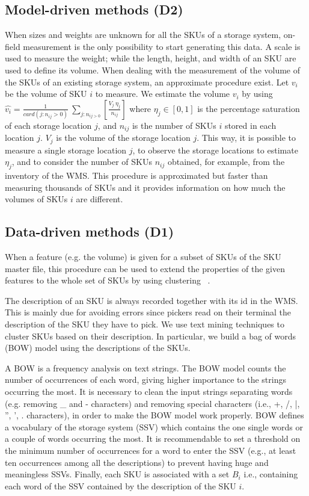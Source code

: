 \subsection{Model-driven methods (D2)}
When sizes and weights are unknown for all the SKUs of a storage system, on-field measurement is the only possibility to start generating this data. A scale is used to measure the weight; while the length, height, and width of an SKU are used to define its volume. When dealing with the measurement of the volume of the SKUs of an existing storage system, an approximate procedure exist. Let $v_i$ be the volume of SKU $i$ to measure. We estimate the volume $v_i$ by using  $\widehat{v_i}=\frac{1}{card(j:n_{ij}>0)}\ \sum_{j:n_{ij>0}}\left[\frac{V_j\ \eta_j}{n_{ij}}\right]$ where  $\eta_j\in[0,1]$ is the percentage saturation of each storage location $j$, and $n_{ij}$ is the number of SKUs $i$ stored in each location $j$. $V_j$ is the volume of the storage location $j$. This way, it is possible to measure a single storage location $j$, to observe the storage locations to estimate $\eta_j$, and to consider the number of SKUs $n_{ij}$ obtained, for example, from the inventory of the WMS. This procedure is approximated but faster than measuring thousands of SKUs and it provides information on how much the volumes of SKUs $i$ are different.

\subsection{Data-driven methods (D1)}
When a feature (e.g. the volume) is given for a subset of SKUs of the SKU master file, this procedure can be used to extend the properties of the given features to the whole set of SKUs by using clustering ~\cite{Tufano2019}.\par

The description of an SKU is always recorded together with its id in the WMS. This is mainly due for avoiding errors since pickers read on their terminal the description of the SKU they have to pick. We use text mining techniques to cluster SKUs based on their description. In particular, we build a bag of words (BOW) model using the descriptions of the SKUs.\par

A BOW is a frequency analysis on text strings. The BOW model counts the number of occurrences of each word, giving higher importance to the strings occurring the most. It is necessary to clean the input strings separating words (e.g. removing \_ and - characters) and removing special characters (i.e., +, /, |, ”,  ’, . characters), in order to make the BOW model work properly. BOW defines a vocabulary of the storage system (SSV) which contains the one single words or a couple of words occurring the most. It is recommendable to set a threshold on the minimum number of occurrences for a word to enter the SSV (e.g., at least ten occurrences among all the descriptions) to prevent having huge and meaningless SSVs. Finally, each SKU is associated with a set $B_i$ i.e., containing each word of the SSV contained by the description of the SKU $i$.\par

